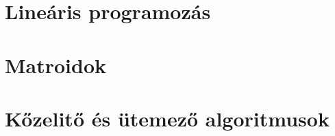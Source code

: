 \documentclass[a4paper,12pt,twoside,openright]{book}
\begin{document}


\tableofcontents
\chapter{Lineáris programozás}







\chapter{Matroidok}







\chapter{Kőzelitő és ütemező algoritmusok}





\end{document}
